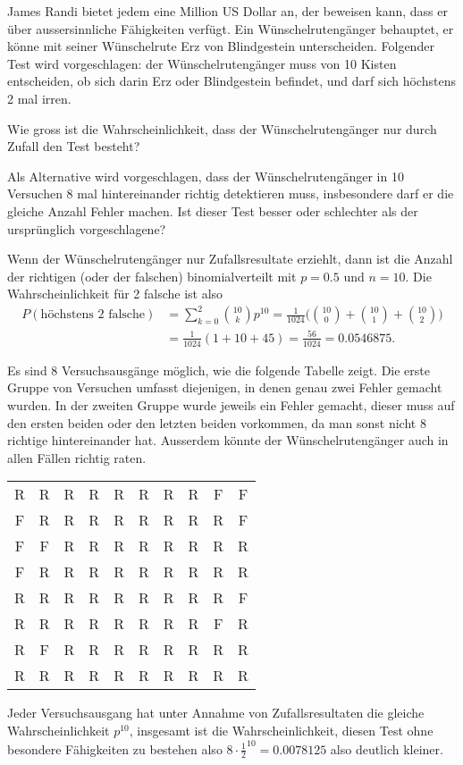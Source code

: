 James Randi bietet jedem eine Million US Dollar an, der beweisen kann,
dass er über aussersinnliche Fähigkeiten verfügt. Ein Wünschelrutengänger
behauptet, er könne mit seiner Wünschelrute Erz von Blindgestein
unterscheiden. Folgender Test wird vorgeschlagen: der Wünschelrutengänger
muss von 10 Kisten entscheiden, ob sich darin Erz oder Blindgestein
befindet, und darf sich höchstens 2 mal irren.
\begin{teilaufgaben}
\item
Wie gross ist die
Wahrscheinlichkeit, dass der Wünschelrutengänger nur durch Zufall
den Test besteht?
\item
Als Alternative wird vorgeschlagen, dass der Wünschelrutengänger
in 10 Versuchen
8 mal hintereinander richtig detektieren muss, insbesondere darf
er die gleiche Anzahl Fehler machen.
Ist dieser Test
besser oder schlechter als der ursprünglich vorgeschlagene?
\end{teilaufgaben}


\begin{loesung}
\begin{teilaufgaben}
\item Wenn der Wünschelrutengänger nur Zufallsresultate erziehlt,
dann ist die Anzahl der richtigen (oder der falschen) binomialverteilt
mit $p=0.5$ und $n=10$. Die Wahrscheinlichkeit für 2 falsche ist also
\begin{align*}
P(\text{höchstens 2 falsche})&=\sum_{k=0}^2 \binom{10}{k}p^{10}
=
\frac1{1024}\biggl(
\binom{10}{0}
+
\binom{10}{1}
+
\binom{10}{2}
\biggr)
\\
&=
\frac1{1024}( 1 + 10 + 45)
=\frac{56}{1024}=0.0546875.
\end{align*}
\item Es sind 8 Versuchsausgänge möglich, wie die folgende Tabelle
zeigt. Die erste Gruppe von Versuchen umfasst diejenigen, in denen
genau zwei Fehler gemacht wurden. In der zweiten Gruppe wurde jeweils
ein Fehler gemacht, dieser muss auf den ersten beiden oder den letzten
beiden vorkommen, da man sonst nicht 8 richtige hintereinander hat.
Ausserdem könnte der Wünschelrutengänger auch in allen Fällen richtig
raten.
\begin{center}
\begin{tabular}{cccccccccc}
R&R&R&R&R&R&R&R&F&F\\
F&R&R&R&R&R&R&R&R&F\\
F&F&R&R&R&R&R&R&R&R\\
\hline
F&R&R&R&R&R&R&R&R&R\\
R&R&R&R&R&R&R&R&R&F\\
R&R&R&R&R&R&R&R&F&R\\
R&F&R&R&R&R&R&R&R&R\\
\hline
R&R&R&R&R&R&R&R&R&R
\end{tabular}
\end{center}
Jeder Versuchsausgang hat unter Annahme von Zufallsresultaten die gleiche
Wahrscheinlichkeit
$p^{10}$, insgesamt ist die Wahrscheinlichkeit, diesen Test ohne
besondere Fähigkeiten zu bestehen also $8\cdot \frac12^{10}=0.0078125$
also deutlich kleiner.
\qedhere
\end{teilaufgaben}
\end{loesung}

